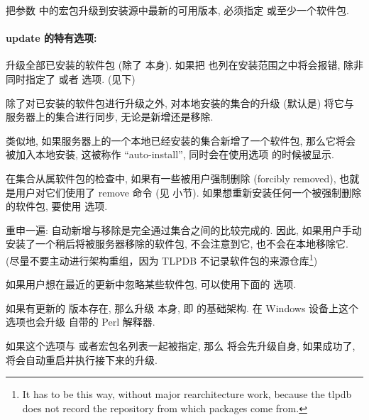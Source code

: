 把参数  中的宏包升级到安装源中最新的可用版本, 必须指定  或至少一个软件包. 

\paragraph{{\mdseries\ac{update}} 的特有选项:}
\begin{description}
    \item {}\par
    升级全部已安装的软件包 (除了 \tlmgr{} 本身). 如果把 \tlmgr 也列在安装范围之中将会报错, 除非同时指定了  或者  选项. (见下)
    
    除了对已安装的软件包进行升级之外, 对本地安装的集合的升级 (默认是) 将它与服务器上的集合进行同步, 无论是新增还是移除. 

    类似地, 如果服务器上的一个本地已经安装的集合新增了一个软件包, 那么它将会被加入本地安装, 这被称作 ``auto-install'', 同时会在使用选项  的时候被显示. 

    在集合从属软件包的检查中, 如果有一些被用户强制删除 (forcibly removed), 也就是用户对它们使用了 \tlmgr{} \ac{remove}  命令 (见  小节). 如果想重新安装任何一个被强制删除的软件包, 要使用 \hyperlink{op:-reinstall-forcibly-removed}{} 选项. 

    重申一遍: 自动新增与移除是完全通过集合之间的比较完成的. 因此, 如果用户手动安装了一个稍后将被服务器移除的软件包, \tlmgr{} 不会注意到它, 也不会在本地移除它. (尽量不要主动进行架构重组，因为 TLPDB 不记录软件包的来源仓库\footnote{It has to be this way, without major rearchitecture work, because the tlpdb does not record the repository from which packages come from.})

    如果用户想在最近的更新中忽略某些软件包, 可以使用下面的 \hyperlink{op:exclude}{} 选项. 
    \item {}\par
    如果有更新的 \tlmgr 版本存在, 那么升级 \tlmgr{} 本身, 即 \tlmgr 的基础架构. 在 Windows 设备上这个选项也会升级 \tl 自带的 Perl 解释器. 

    如果这个选项与  或者宏包名列表一起被指定, 那么 \tlmgr 将会先升级自身, 如果成功了, \tlmgr 将会自动重启并执行接下来的升级. 


\end{description}
